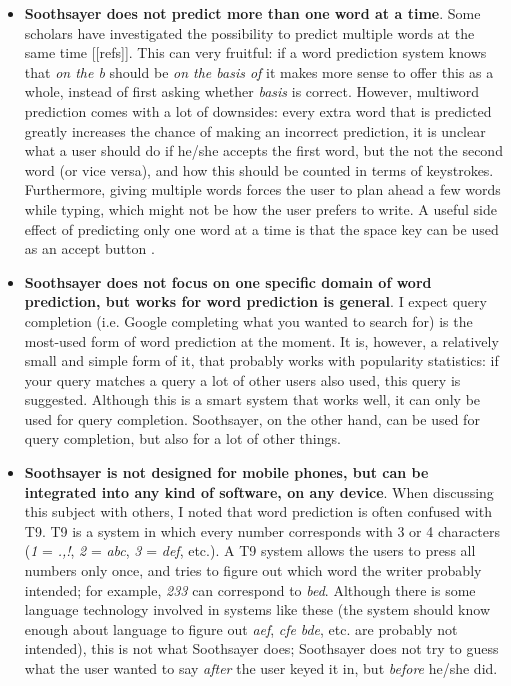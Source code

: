 \documentclass[12pt]{article}
\begin{document}
\begin{itemize}
\item \textbf{Soothsayer does not predict more than one word at a time}. Some scholars have investigated the possibility to predict multiple words at the same time [[refs]]. This can very fruitful: if a word prediction system knows that \emph{on the b} should be \emph{on the basis of} it makes more sense to offer this as a whole, instead of first asking whether \emph{basis} is correct. However, multiword prediction comes with a lot of downsides: every extra word that is predicted greatly increases the chance of making an incorrect prediction, it is unclear what a user should do if he/she accepts the first word, but the not the second word (or vice versa), and how this should be counted in terms of keystrokes. Furthermore, giving multiple words forces the user to plan ahead a few words while typing, which might not be how the user prefers to write. A useful side effect of predicting only one word at a time is that the space key can be used as an accept button \cite{Garay-Vitoria+06}.


\item \textbf{Soothsayer does not focus on one specific domain of word prediction, but works for word prediction is general}. I expect query completion (i.e. Google completing what you wanted to search for) is the most-used form of word prediction at the moment. It is, however, a relatively small and simple form of it, that probably works with popularity statistics: if your query matches a query a lot of other users also used, this query is suggested. Although this is a smart system that works well, it can only be used for query completion. Soothsayer, on the other hand, can be used for query completion, but also for a lot of other things.

\item \textbf{Soothsayer is not designed for mobile phones, but can be integrated into any kind of software, on any device}. When discussing this subject with others, I noted that word prediction is often confused with T9. T9 is a system in which every number corresponds with 3 or 4 characters (\emph{1} = \emph{.,!}, \emph{2} = \emph{abc}, \emph{3} = \emph{def}, etc.). A T9 system allows the users to press all numbers only once, and tries to figure out which word the writer probably intended; for example, \emph{233} can correspond to \emph{bed}. Although there is some language technology involved in systems like these (the system should know enough about language to figure out \emph{aef}, \emph{cfe} \emph{bde}, etc. are probably not intended), this is not what Soothsayer does; Soothsayer does not try to guess what the user wanted to say \emph{after} the user keyed it in, but \emph{before} he/she did. 


\end{itemize}
\end{document}
